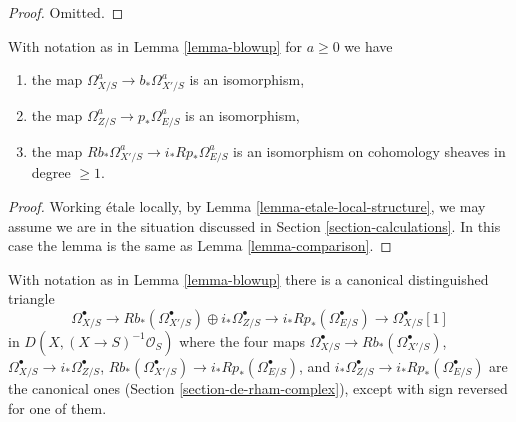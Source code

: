 \begin{proof}
Omitted.
\end{proof}

\begin{lemma}
\label{lemma-comparison-general}
With notation as in Lemma \ref{lemma-blowup} for $a \geq 0$ we have
\begin{enumerate}
\item the map
$\Omega^a_{X/S} \to b_*\Omega^a_{X'/S}$ is an isomorphism,
\item the map $\Omega^a_{Z/S} \to p_*\Omega^a_{E/S}$ is an isomorphism,
\item the map $Rb_*\Omega^a_{X'/S} \to i_*Rp_*\Omega^a_{E/S}$ is an isomorphism
on cohomology sheaves in degree $\geq 1$.
\end{enumerate}
\end{lemma}

\begin{proof}
Working \'etale locally, by Lemma \ref{lemma-etale-local-structure},
we may assume we are in the situation discussed in
Section \ref{section-calculations}. In this case the lemma
is the same as Lemma \ref{lemma-comparison}.
\end{proof}

\begin{lemma}
\label{lemma-distinguished-triangle-blowup}
With notation as in Lemma \ref{lemma-blowup} there is a canonical
distinguished triangle
$$
\Omega^\bullet_{X/S} \to
Rb_*(\Omega^\bullet_{X'/S}) \oplus i_*\Omega^\bullet_{Z/S} \to
i_*Rp_*(\Omega^\bullet_{E/S}) \to
\Omega^\bullet_{X/S}[1]
$$
in $D(X, (X \to S)^{-1}\mathcal{O}_S)$ where the four maps
$\Omega^\bullet_{X/S} \to Rb_*(\Omega^\bullet_{X'/S})$,
$\Omega^\bullet_{X/S} \to i_*\Omega^\bullet_{Z/S}$,
$Rb_*(\Omega^\bullet_{X'/S}) \to i_*Rp_*(\Omega^\bullet_{E/S})$, and
$i_*\Omega^\bullet_{Z/S} \to i_*Rp_*(\Omega^\bullet_{E/S})$
are the canonical ones (Section \ref{section-de-rham-complex}),
except with sign reversed for one of them.
\end{lemma}

